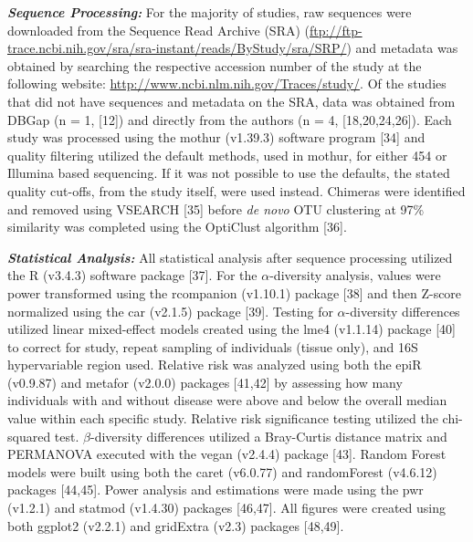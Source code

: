 \documentclass[12pt,]{article}
\begin{document}
\textbf{\emph{Sequence Processing:}} For the majority of studies, raw
sequences were downloaded from the Sequence Read Archive (SRA)
(\url{ftp://ftp-trace.ncbi.nih.gov/sra/sra-instant/reads/ByStudy/sra/SRP/})
and metadata was obtained by searching the respective accession number
of the study at the following website:
\url{http://www.ncbi.nlm.nih.gov/Traces/study/}. Of the studies that did
not have sequences and metadata on the SRA, data was obtained from DBGap
(n = 1, {[}12{]}) and directly from the authors (n = 4,
{[}18,20,24,26{]}). Each study was processed using the mothur (v1.39.3)
software program {[}34{]} and quality filtering utilized the default
methods, used in mothur, for either 454 or Illumina based sequencing. If
it was not possible to use the defaults, the stated quality cut-offs,
from the study itself, were used instead. Chimeras were identified and
removed using VSEARCH {[}35{]} before \emph{de novo} OTU clustering at
97\% similarity was completed using the OptiClust algorithm {[}36{]}.

\textbf{\emph{Statistical Analysis:}} All statistical analysis after
sequence processing utilized the R (v3.4.3) software package {[}37{]}.
For the \(\alpha\)-diversity analysis, values were power transformed
using the rcompanion (v1.10.1) package {[}38{]} and then Z-score
normalized using the car (v2.1.5) package {[}39{]}. Testing for
\(\alpha\)-diversity differences utilized linear mixed-effect models
created using the lme4 (v1.1.14) package {[}40{]} to correct for study,
repeat sampling of individuals (tissue only), and 16S hypervariable
region used. Relative risk was analyzed using both the epiR (v0.9.87)
and metafor (v2.0.0) packages {[}41,42{]} by assessing how many
individuals with and without disease were above and below the overall
median value within each specific study. Relative risk significance
testing utilized the chi-squared test. \(\beta\)-diversity differences
utilized a Bray-Curtis distance matrix and PERMANOVA executed with the
vegan (v2.4.4) package {[}43{]}. Random Forest models were built using
both the caret (v6.0.77) and randomForest (v4.6.12) packages
{[}44,45{]}. Power analysis and estimations were made using the pwr
(v1.2.1) and statmod (v1.4.30) packages {[}46,47{]}. All figures were
created using both ggplot2 (v2.2.1) and gridExtra (v2.3) packages
{[}48,49{]}.
\end{document}
